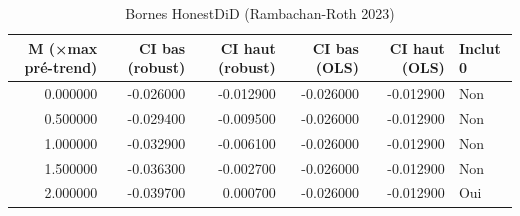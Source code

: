 \begin{table}
\caption{Bornes HonestDiD (Rambachan-Roth 2023)}
\label{tab:honestdid}
\begin{tabular}{rrrrrl}
\toprule
M (×max pré-trend) & CI bas (robust) & CI haut (robust) & CI bas (OLS) & CI haut (OLS) & Inclut 0 \\
\midrule
0.000000 & -0.026000 & -0.012900 & -0.026000 & -0.012900 & Non \\
0.500000 & -0.029400 & -0.009500 & -0.026000 & -0.012900 & Non \\
1.000000 & -0.032900 & -0.006100 & -0.026000 & -0.012900 & Non \\
1.500000 & -0.036300 & -0.002700 & -0.026000 & -0.012900 & Non \\
2.000000 & -0.039700 & 0.000700 & -0.026000 & -0.012900 & Oui \\
\bottomrule
\end{tabular}
\end{table}
